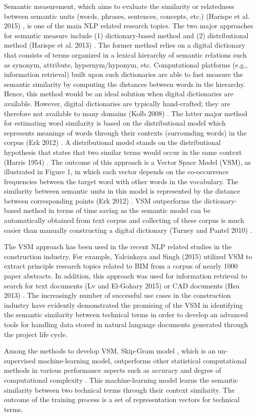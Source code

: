 \documentclass[Journal, InsideFigs, DoubleSpace]{ascelike} %
\begin{document}
Semantic measurement, which aims to evaluate the similarity or relatedness between semantic units (words, phrases, sentences, concepts, etc.) (Harispe et al. 2015) \cite{harispe15}, is one of the main NLP related research topics. The two major approaches for semantic measure include (1) dictionary-based method and (2) distributional method (Harispe et al. 2013) \cite{harispe13}.  The former method relies on a digital dictionary that consists of terms organized in a lexical hierarchy of semantic relations such as synonym, attribute, hypernym/hyponym, etc. Computational platforms (e.g., information retrieval) built upon such dictionaries are able to fast measure the semantic similarity by computing the distances between words in the hierarchy. Hence, this method would be an ideal solution when digital dictionaries are available. However, digital dictionaries are typically hand-crafted; they are therefore not available to many domains (Kolb 2008) \cite{kolb08}. The latter major method for estimating word similarity is based on the distributional model which represents meanings of words through their contexts (surrounding words) in the corpus (Erk 2012) \cite{erk12}. A distributional model stands on the distributional hypothesis that states that two similar terms would occur in the same context (Harris 1954) \cite{harris54}. The outcome of this approach is a Vector Space Model (VSM), as illustrated in Figure 1, in which each vector depends on the co-occurrence frequencies between the target word with other words in the vocabulary. The similarity between semantic units in this model is represented by the distance between corresponding points (Erk 2012) \cite{erk12}. VSM outperforms the dictionary-based method in terms of time saving as the semantic model can be automatically obtained from text corpus and collecting of these corpus is much easier than manually constructing a digital dictionary (Turney and Pantel 2010) \cite{turney10}.
\par
The VSM approach has been used in the recent NLP related studies in the construction industry. For example, Yalcinkaya and Singh (2015) \cite{yalcinkaya15} utilized VSM to extract principle research topics related to BIM from a corpus of nearly 1000 paper abstracts. In addition, this approach was used for information retrieval to search for text documents (Lv and El-Gohary 2015) \cite{lv15} or CAD documents (Hsu 2013) \cite{hsu13}. The increasingly number of successful use cases in the construction industry have evidently demonstrated the promising of the VSM in identifying the semantic similarity between technical terms in order to develop an advanced tools for handling data stored in natural language documents generated through the project life cycle.
\par
Among the methods to develop VSM, Skip-Gram model \cite{mikolov13a}, which is an un-supervised machine-learning model, outperforms other statistical computational methods in various performance aspects such as accuracy and degree of computational complexity \cite{mikolov13a}. This machine-learning model learns the semantic similarity between two technical terms through their context similarity. The outcome of the training process is a set of representation vectors for technical terms. 
%
\end{document}

